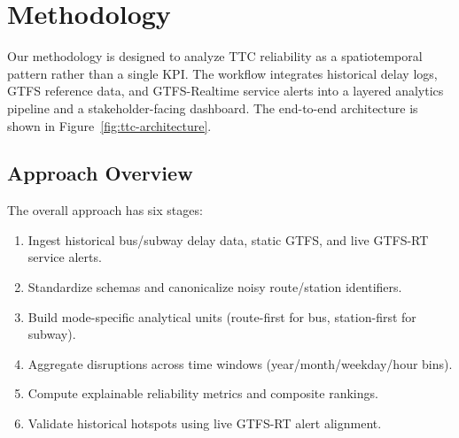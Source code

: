 \section{Methodology}

Our methodology is designed to analyze TTC reliability as a spatiotemporal pattern rather than a single KPI. The workflow integrates historical delay logs, GTFS reference data, and GTFS-Realtime service alerts into a layered analytics pipeline and a stakeholder-facing dashboard. The end-to-end architecture is shown in Figure~\ref{fig:ttc-architecture}.

\subsection{Approach Overview}
The overall approach has six stages:
\begin{enumerate}
    \item Ingest historical bus/subway delay data, static GTFS, and live GTFS-RT service alerts.
    \item Standardize schemas and canonicalize noisy route/station identifiers.
    \item Build mode-specific analytical units (route-first for bus, station-first for subway).
    \item Aggregate disruptions across time windows (year/month/weekday/hour bins).
    \item Compute explainable reliability metrics and composite rankings.
    \item Validate historical hotspots using live GTFS-RT alert alignment.
\end{enumerate}

